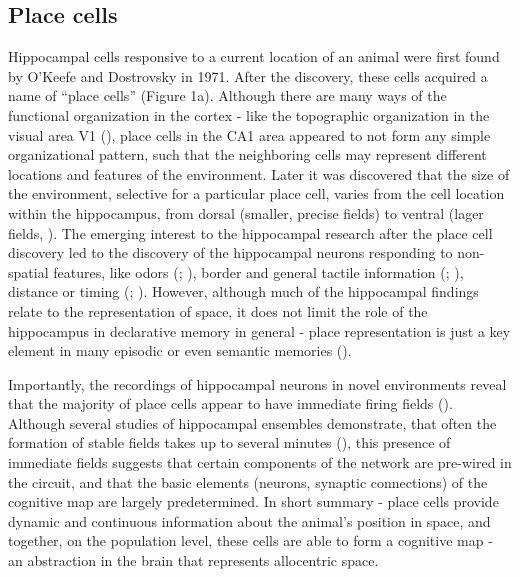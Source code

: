 \subsection{Place cells}

Hippocampal cells responsive to a current location of an animal were first found by O’Keefe and Dostrovsky in 1971. After the discovery, these cells acquired a name of “place cells” (Figure 1a). Although there are many ways of the functional organization in the cortex - like the topographic organization in the visual area V1 (\cite{Schuett2002}), place cells in the CA1 area appeared to not form any simple organizational pattern, such that the neighboring cells may represent different locations and features of the environment. Later it was discovered that the size of the environment, selective for a particular place cell, varies from the cell location within the hippocampus, from dorsal (smaller, precise fields) to ventral (lager fields, \cite{Jung1994}). The emerging interest to the hippocampal research after the place cell discovery led to the discovery of the hippocampal neurons responding to non-spatial features, like odors (\cite{Wood1999}; \cite{Igarashi2014}), border and general tactile information (\cite{Young1994}; \cite{Okeefe1996}), distance or timing (\cite{Hampson1993}; \cite{Kautzky2016}). However, although much of the hippocampal findings relate to the representation of space, it does not limit the role of the hippocampus in declarative memory in general - place representation is just a key element in many episodic or even semantic memories (\cite{Buzsaki2013}).

Importantly, the recordings of hippocampal neurons in novel environments reveal that the majority of place cells appear to have immediate firing fields (\cite{Frank7681}). Although several studies of hippocampal ensembles demonstrate, that often the formation of stable fields takes up to several minutes (\cite{Wilson1993a}), this presence of immediate fields suggests that certain components of the network are pre-wired in the circuit, and that the basic elements (neurons, synaptic connections) of the cognitive map are largely predetermined.
In short summary - place cells provide dynamic and continuous information about the animal’s position in space, and together, on the population level, these cells are able to form a cognitive map - an abstraction in the brain that represents allocentric space.


